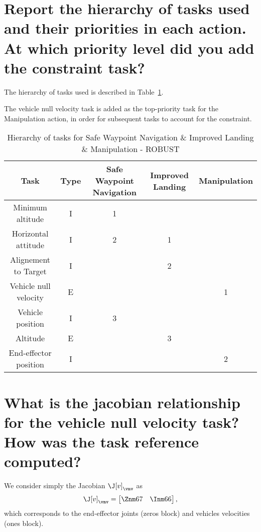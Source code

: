 	\begin{parts}
		\part{Report the hierarchy of tasks used and their priorities in
		each action. At which priority level did you add the constraint task?}

		\begin{solutionorbox}
			The hierarchy of tasks used is described in
			Table~\ref{table:tkip_swn_improved_landing_manipulation_robust}.

			The vehicle null velocity task is added as the
			top-priority task for the Manipulation action, in order
			for subsequent tasks to account for the constraint.
		\end{solutionorbox}

		\begin{table}[htb] 
			\caption{Hierarchy of tasks for Safe Waypoint Navigation
			\& Improved Landing \& Manipulation - ROBUST}
			\label{table:tkip_swn_improved_landing_manipulation_robust}
			\begin{center}
				\footnotesize
				\begin{tabular}{ccccc}
					\toprule Task & Type &
					Safe Waypoint Navigation & Improved
					Landing & Manipulation\\
					\midrule Minimum altitude & I & 1 & &\\
					\hdashline Horizontal attitude & I & 2 & 1& \\
					\hdashline Alignement to Target & I & & 2&\\
					\hdashline Vehicle null velocity & E & & & 1\\
					\hdashline Vehicle position & I & 3 & &\\
					\hdashline Altitude & E &  & 3& \\
					\hdashline End-effector position & I & & & 2\\
					\bottomrule
				\end{tabular}%
			\end{center}%
		\end{table}%

		\part{What is the jacobian relationship for the vehicle null
		velocity task? How was the task reference computed?}

		\begin{solutionorbox}
			We consider simply the Jacobian $\J[v]_{\vnv}$ as
			\[
				\J[v]_{\vnv} = \begin{bmatrix}
					\Znm67\quad
					\Inm66
				\end{bmatrix}
				\mathrm{,}
			\]
			which corresponds to the end-effector joints (zeros
			block) and vehicles velocities (ones block).


\end{solutionorbox}
\end{parts}

